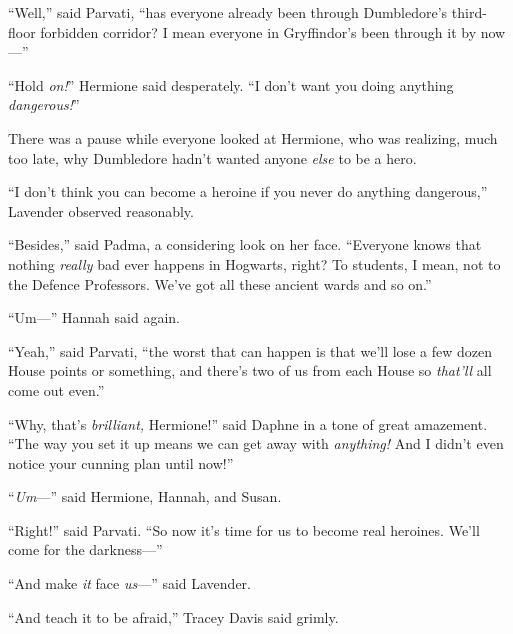 “Well,” said Parvati, “has everyone already been through Dumbledore’s third-floor forbidden corridor? I mean everyone in Gryffindor’s been through it by now—”

“Hold \emph{on!}” Hermione said desperately. “I don’t want you doing anything \emph{dangerous!}”

There was a pause while everyone looked at Hermione, who was realizing, much too late, why Dumbledore hadn’t wanted anyone \emph{else} to be a hero.

“I don’t think you can become a heroine if you never do anything dangerous,” Lavender observed reasonably.

“Besides,” said Padma, a considering look on her face. “Everyone knows that nothing \emph{really} bad ever happens in Hogwarts, right? To students, I mean, not to the Defence Professors. We’ve got all these ancient wards and so on.”

“Um—” Hannah said again.

“Yeah,” said Parvati, “the worst that can happen is that we’ll lose a few dozen House points or something, and there’s two of us from each House so \emph{that’ll} all come out even.”

“Why, that’s \emph{brilliant,} Hermione!” said Daphne in a tone of great amazement. “The way you set it up means we can get away with \emph{anything!} And I didn’t even notice your cunning plan until now!”

“\emph{Um}—” said Hermione, Hannah, and Susan.

“Right!” said Parvati. “So now it’s time for us to become real heroines. We’ll come for the darkness—”

“And make \emph{it} face \emph{us}—” said Lavender.

“And teach it to be afraid,” Tracey Davis said grimly.
